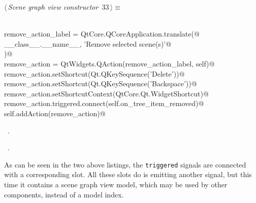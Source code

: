 \documentclass[
    a4paper,      %
    10pt,         %
    openright,    %
    notitlepage,  %
    parskip=half, %
]{scrreprt}       %
\theoremstyle{definition}                    %
\begin{document}
\begin{flushleft} \small
\begin{minipage}{\linewidth}\label{scrap39}\raggedright\small
{} $\langle\,${\itshape Scene graph view constructor}\nobreak\ {\footnotesize {33}}$\,\rangle\equiv$
\vspace{-1ex}
\begin{list}{}{} \item
\mbox{}\lstinline@@\\
\mbox{}\lstinline@    remove_action_label = QtCore.QCoreApplication.translate(@\\
\mbox{}\lstinline@        __class__.__name__, 'Remove selected scene(s)'@\\
\mbox{}\lstinline@    )@\\
\mbox{}\lstinline@    remove_action = QtWidgets.QAction(remove_action_label, self)@\\
\mbox{}\lstinline@    remove_action.setShortcut(Qt.QKeySequence('Delete'))@\\
\mbox{}\lstinline@    remove_action.setShortcut(Qt.QKeySequence('Backspace'))@\\
\mbox{}\lstinline@    remove_action.setShortcutContext(QtCore.Qt.WidgetShortcut)@\\
\mbox{}\lstinline@    remove_action.triggered.connect(self.on_tree_item_removed)@\\
\mbox{}\lstinline@    self.addAction(remove_action)@\\
\mbox{}\lstinline@@{\NWsep}
\end{list}
\vspace{-1.5ex}
\footnotesize
\begin{list}{}{\setlength{\itemsep}{-\parsep}\setlength{\itemindent}{-\leftmargin}}
\item \NWtxtMacroDefBy\ .
\item \NWtxtMacroRefIn\ .

\item{}
\end{list}
\end{minipage}\vspace{4ex}
\end{flushleft}
As can be seen in the two above listings, the \verb+triggered+ signals are
connected with a corresponding slot. All these slots do is emitting another
signal, but this time it contains a scene graph view model, which may be used by
other components, instead of a model index.
\end{document}
